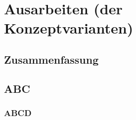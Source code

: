 \section{Ausarbeiten (der Konzeptvarianten)}
\subsection{Zusammenfassung}
\subsection{ABC}
\subsubsection{ABCD}